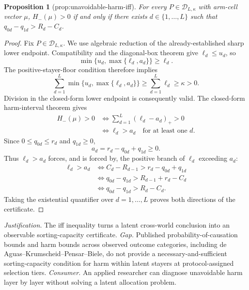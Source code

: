 \documentclass{article}
\newtheorem{proposition}{Proposition}
\begin{document}
\begin{proposition}[prop:unavoidable-harm-iff]\label{prop:unavoidable-harm-iff}
For every \(P\in\mathcal D_{L,\kappa}\) with arm-cell vector \(\mu\), \(H_-(\mu)>0\) if and only if there exists \(d\in\{1,\ldots,L\}\) such that \(q_{0d}-q_{1d}>R_d-C_d\).
\end{proposition}
\begin{proof}
Fix \(P\in\mathcal D_{L,\kappa}\).  We use algebraic reduction of the already-established sharp lower endpoint.  Compatibility and the diagonal-box theorem give \(\ell_d\le u_d\), so
\[
 \min\{u_d,\max\{\ell_d,a_d\}\}\ge\ell_d.
\]
The positive-stayer-floor condition therefore implies
\[
 \sum_{d=1}^{L}\min\{u_d,\max\{\ell_d,a_d\}\}
 \ge\sum_{d=1}^{L}\ell_d
 \ge\kappa>0.
\]
Division in the closed-form lower endpoint is consequently valid.  The closed-form harm-interval theorem gives
\[
 \begin{aligned}
 H_-(\mu)>0
 &\Longleftrightarrow
 \sum_{d=1}^{L}(\ell_d-a_d)_+>0\\
 &\Longleftrightarrow
 \ell_d>a_d\quad\text{for at least one }d.
 \end{aligned}
\]
Since \(0\le q_{0d}\le r_d\) and \(q_{1d}\ge0\),
\[
 a_d=r_d-q_{0d}+q_{1d}\ge0.
\]
Thus \(\ell_d>a_d\) forces, and is forced by, the positive branch of \(\ell_d\) exceeding \(a_d\):
\[
 \begin{aligned}
 \ell_d>a_d
 &\Longleftrightarrow C_d-R_{d-1}>r_d-q_{0d}+q_{1d}\\
 &\Longleftrightarrow q_{0d}-q_{1d}>R_{d-1}+r_d-C_d\\
 &\Longleftrightarrow q_{0d}-q_{1d}>R_d-C_d.
 \end{aligned}
\]
Taking the existential quantifier over \(d=1,\ldots,L\) proves both directions of the certificate.
\end{proof}
\par\smallskip\noindent \textit{Justification.} The iff inequality turns a latent cross-world conclusion into an observable sorting-capacity certificate. \textit{Gap.} Published probability-of-causation bounds and harm bounds across observed outcome categories, including de Aguas--Krumscheid--Pensar--Biele, do not provide a necessary-and-sufficient sorting-capacity condition for harm within latent stayers at protocol-assigned selection tiers. \textit{Consumer.} An applied researcher can diagnose unavoidable harm layer by layer without solving a latent allocation problem.
\end{document}
